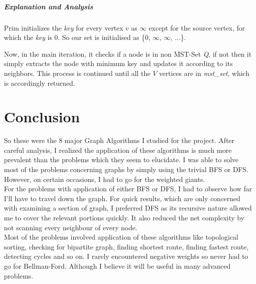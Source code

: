 \documentclass[11pt,a4paper]{extarticle}
\begin{document}
\subparagraph{Explanation and Analysis}
Prim initializes the \textit{key} for every vertex $v$ as $\infty$ except for the source vertex, for which the \textit{key} is $0$. So our set is initialised as \{0, $\infty$, $\infty$, ...\}.
\linebreak

Now, in the main iteration, it checks if a node is in non MST-Set \textit{Q}, if not then it simply extracts the node with minimum key and updates it according to its neighbors. This process is continued until all the $V$ vertices are in \textit{mst\_set}, which is accordingly returned.

\section{Conclusion}
So these were the 8 major Graph Algorithms I studied for the project. After careful analysis, I realized the application of these algorithms is much more prevalent than the problems which they seem to elucidate. I was able to solve most of the problems concerning graphs by simply using the trivial BFS or DFS. However, on certain occasions, I had to go for the weighted giants. \\

For the problems with application of either BFS or DFS, I had to observe how far I'll have to travel down the graph. For quick results, which are only concerned with examining a section of graph, I preferred DFS as its recursive nature allowed me to cover the relevant portions quickly. It also reduced the net complexity by not scanning every neighbour of every node. \\

Most of the problems involved application of these algorithms like topological sorting, checking for bipartite graph, finding shortest route, finding fastest route, detecting cycles and so on. I rarely encountered negative weights so never had to go for Bellman-Ford. Although I believe it will be useful in many advanced problems.
\end{document}
